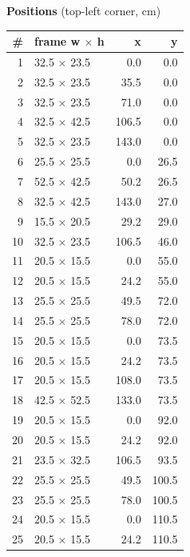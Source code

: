 \documentclass[a4paper,landscape,10pt]{article}
\begin{document}
\begin{minipage}[t]{0.25\textwidth}
\vspace{8pt}
{\bfseries Positions} (top-left corner, cm)\\[2pt]
\tiny
\begin{tabular}{@{}r l r r@{}}
\toprule
\# & frame w $\times$ h & x & y \\
\midrule
1 & 32.5 $\times$ 23.5 & 0.0 & 0.0 \\
2 & 32.5 $\times$ 23.5 & 35.5 & 0.0 \\
3 & 32.5 $\times$ 23.5 & 71.0 & 0.0 \\
4 & 32.5 $\times$ 42.5 & 106.5 & 0.0 \\
5 & 32.5 $\times$ 23.5 & 143.0 & 0.0 \\
6 & 25.5 $\times$ 25.5 & 0.0 & 26.5 \\
7 & 52.5 $\times$ 42.5 & 50.2 & 26.5 \\
8 & 32.5 $\times$ 42.5 & 143.0 & 27.0 \\
9 & 15.5 $\times$ 20.5 & 29.2 & 29.0 \\
10 & 32.5 $\times$ 23.5 & 106.5 & 46.0 \\
11 & 20.5 $\times$ 15.5 & 0.0 & 55.0 \\
12 & 20.5 $\times$ 15.5 & 24.2 & 55.0 \\
13 & 25.5 $\times$ 25.5 & 49.5 & 72.0 \\
14 & 25.5 $\times$ 25.5 & 78.0 & 72.0 \\
15 & 20.5 $\times$ 15.5 & 0.0 & 73.5 \\
16 & 20.5 $\times$ 15.5 & 24.2 & 73.5 \\
17 & 20.5 $\times$ 15.5 & 108.0 & 73.5 \\
18 & 42.5 $\times$ 52.5 & 133.0 & 73.5 \\
19 & 20.5 $\times$ 15.5 & 0.0 & 92.0 \\
20 & 20.5 $\times$ 15.5 & 24.2 & 92.0 \\
21 & 23.5 $\times$ 32.5 & 106.5 & 93.5 \\
22 & 25.5 $\times$ 25.5 & 49.5 & 100.5 \\
23 & 25.5 $\times$ 25.5 & 78.0 & 100.5 \\
24 & 20.5 $\times$ 15.5 & 0.0 & 110.5 \\
25 & 20.5 $\times$ 15.5 & 24.2 & 110.5 \\
\bottomrule
\end{tabular}
\end{minipage}
\clearpage
\end{document}
